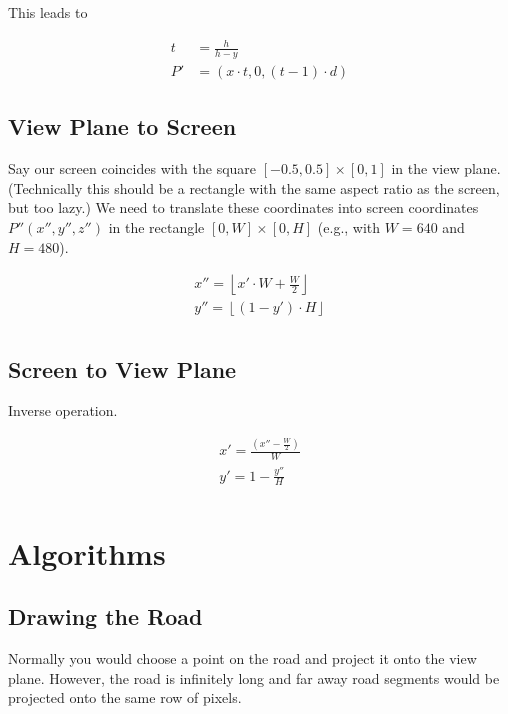 \documentclass[a4paper]{article}
\newcommand{\coords}[3]{\ensuremath{(#1,#2,#3)}}
\begin{document}
This leads to

\begin{align*}
    t & = \frac{h}{h-y} \\
    P' & = \coords{x \cdot t}{0}{(t - 1) \cdot d}
\end{align*}

\subsection{View Plane to Screen}\label{sec:view2screen}

Say our screen coincides with the square $[-0.5,0.5] \times [0,1]$ in the view plane. (Technically this should be a rectangle with the same aspect ratio as the screen, but too lazy.)
We need to translate these coordinates into screen coordinates $P''(x'', y'', z'')$ in the rectangle $[0,W] \times [0,H]$ (e.g., with $W=640$ and $H=480$).

\begin{align*}
    x'' = \left\lfloor x' \cdot W + \frac{W}{2} \right\rfloor \\
    y'' = \left\lfloor (1-y') \cdot H \right\rfloor \\
\end{align*}

\subsection{Screen to View Plane}\label{sec:screen2view}

Inverse operation.

\begin{align*}
    x' = \frac{(x'' - \frac{W}{2})}{W} \\
    y' = 1 - \frac{y''}{H} \\
\end{align*}


\section{Algorithms}

\subsection{Drawing the Road}

Normally you would choose a point on the road and project it onto the view plane. However, the road is infinitely long and
far away road segments would be projected onto the same row of pixels.
\end{document}
